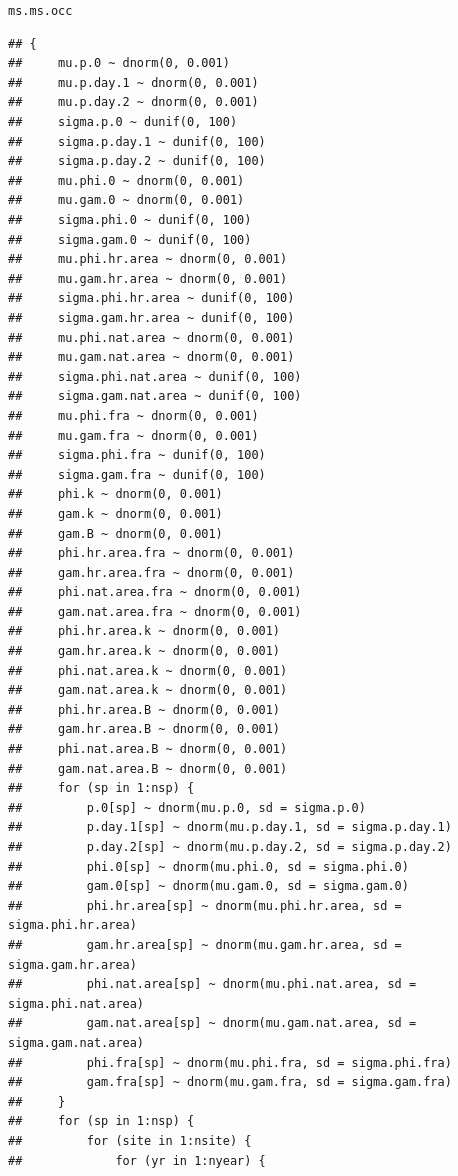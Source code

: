 \documentclass{article}\usepackage[]{graphicx}\usepackage[]{color}
\makeatletter
\newcommand{\hlstd}[1]{\textcolor[rgb]{0.345,0.345,0.345}{#1}}%
\newenvironment{kframe}{%
 \def\at@end@of@kframe{}%
 \ifinner\ifhmode%
  \def\at@end@of@kframe{\end{minipage}}%
  \begin{minipage}{\columnwidth}%
 \fi\fi%
 \def\FrameCommand##1{\hskip\@totalleftmargin \hskip-\fboxsep
 \colorbox{shadecolor}{##1}\hskip-\fboxsep
     \hskip-\linewidth \hskip-\@totalleftmargin \hskip\columnwidth}%
 \MakeFramed {\advance\hsize-\width
   \@totalleftmargin\z@ \linewidth\hsize
   \@setminipage}}%
 {\par\unskip\endMakeFramed%
 \at@end@of@kframe}
\newenvironment{knitrout}{}{} %
\makeatother
\begin{document}
\begin{knitrout}
\color{fgcolor}\begin{kframe}
\begin{alltt}
\hlstd{ms.ms.occ}
\end{alltt}
\begin{verbatim}
## {
##     mu.p.0 ~ dnorm(0, 0.001)
##     mu.p.day.1 ~ dnorm(0, 0.001)
##     mu.p.day.2 ~ dnorm(0, 0.001)
##     sigma.p.0 ~ dunif(0, 100)
##     sigma.p.day.1 ~ dunif(0, 100)
##     sigma.p.day.2 ~ dunif(0, 100)
##     mu.phi.0 ~ dnorm(0, 0.001)
##     mu.gam.0 ~ dnorm(0, 0.001)
##     sigma.phi.0 ~ dunif(0, 100)
##     sigma.gam.0 ~ dunif(0, 100)
##     mu.phi.hr.area ~ dnorm(0, 0.001)
##     mu.gam.hr.area ~ dnorm(0, 0.001)
##     sigma.phi.hr.area ~ dunif(0, 100)
##     sigma.gam.hr.area ~ dunif(0, 100)
##     mu.phi.nat.area ~ dnorm(0, 0.001)
##     mu.gam.nat.area ~ dnorm(0, 0.001)
##     sigma.phi.nat.area ~ dunif(0, 100)
##     sigma.gam.nat.area ~ dunif(0, 100)
##     mu.phi.fra ~ dnorm(0, 0.001)
##     mu.gam.fra ~ dnorm(0, 0.001)
##     sigma.phi.fra ~ dunif(0, 100)
##     sigma.gam.fra ~ dunif(0, 100)
##     phi.k ~ dnorm(0, 0.001)
##     gam.k ~ dnorm(0, 0.001)
##     gam.B ~ dnorm(0, 0.001)
##     phi.hr.area.fra ~ dnorm(0, 0.001)
##     gam.hr.area.fra ~ dnorm(0, 0.001)
##     phi.nat.area.fra ~ dnorm(0, 0.001)
##     gam.nat.area.fra ~ dnorm(0, 0.001)
##     phi.hr.area.k ~ dnorm(0, 0.001)
##     gam.hr.area.k ~ dnorm(0, 0.001)
##     phi.nat.area.k ~ dnorm(0, 0.001)
##     gam.nat.area.k ~ dnorm(0, 0.001)
##     phi.hr.area.B ~ dnorm(0, 0.001)
##     gam.hr.area.B ~ dnorm(0, 0.001)
##     phi.nat.area.B ~ dnorm(0, 0.001)
##     gam.nat.area.B ~ dnorm(0, 0.001)
##     for (sp in 1:nsp) {
##         p.0[sp] ~ dnorm(mu.p.0, sd = sigma.p.0)
##         p.day.1[sp] ~ dnorm(mu.p.day.1, sd = sigma.p.day.1)
##         p.day.2[sp] ~ dnorm(mu.p.day.2, sd = sigma.p.day.2)
##         phi.0[sp] ~ dnorm(mu.phi.0, sd = sigma.phi.0)
##         gam.0[sp] ~ dnorm(mu.gam.0, sd = sigma.gam.0)
##         phi.hr.area[sp] ~ dnorm(mu.phi.hr.area, sd = sigma.phi.hr.area)
##         gam.hr.area[sp] ~ dnorm(mu.gam.hr.area, sd = sigma.gam.hr.area)
##         phi.nat.area[sp] ~ dnorm(mu.phi.nat.area, sd = sigma.phi.nat.area)
##         gam.nat.area[sp] ~ dnorm(mu.gam.nat.area, sd = sigma.gam.nat.area)
##         phi.fra[sp] ~ dnorm(mu.phi.fra, sd = sigma.phi.fra)
##         gam.fra[sp] ~ dnorm(mu.gam.fra, sd = sigma.gam.fra)
##     }
##     for (sp in 1:nsp) {
##         for (site in 1:nsite) {
##             for (yr in 1:nyear) {

\end{verbatim}
\end{kframe}
\end{knitrout}
\end{document}
